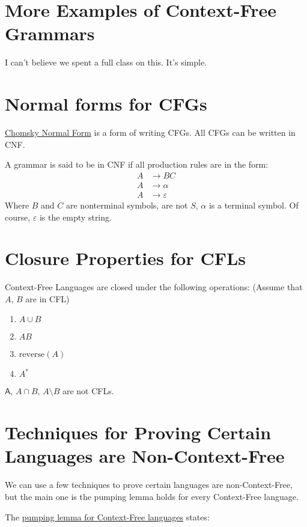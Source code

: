     \section{More Examples of Context-Free Grammars}
        I can't believe we spent a full class on this. It's simple.

    \section{Normal forms for CFGs}
        \href{http://en.wikipedia.org/wiki/Chomsky_normal_form}{Chomsky Normal Form}
        is a form of writing CFGs. All CFGs can be written in CNF.

        A grammar is said to be in CNF if all production rules are in the form:
        \begin{align*}
            A &\to BC \\
            A &\to \alpha \\
            A &\to \varepsilon
        \end{align*}
        Where $B$ and $C$ are nonterminal symbols, are not $S$, $\alpha$ is a
        terminal symbol. Of course, $\varepsilon$ is the empty string.
    \section{Closure Properties for CFLs}
        Context-Free Languages are closed under the following operations:
        (Assume that $A$, $B$ are in CFL)
        \begin{enumerate}
            \item $A \cup B$
            \item $AB$
            \item $\text{reverse}(A)$
            \item $A^*$
        \end{enumerate}
        $\mathsf{A}$, $A \cap B$, $A \setminus B$ are not CFLs.

    \section{Techniques for Proving Certain Languages are Non-Context-Free}
        We can use a few techniques to prove certain languages are
        non-Context-Free, but the main one is the pumping lemma holds for every
        Context-Free language.

        The \uline{pumping lemma for Context-Free languages} states:

